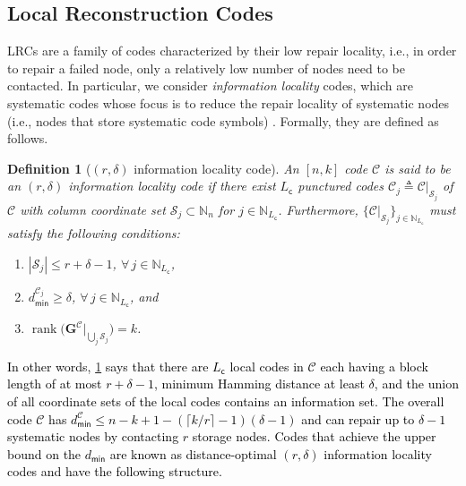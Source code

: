 \documentclass[twocolumn,conference]{IEEEtran}
\newtheorem{definition}{Definition}
\newcommand{\eqdef}{\triangleq}              %
\newcommand{\set}[1]{\mathcal{#1}}           %
\newcommand{\Nat}[1]{\mathbb{N}_{#1}}        %
\newcommand{\code}[1]{\mathcal{#1}}          %
\newcommand{\bigrank}[1]{\operatorname{rank}\bigl(#1\bigr)}
\newcommand{\modify}[1]{\textcolor{black}{#1}}
\begin{document}
\subsection{Local Reconstruction Codes}
\label{sec:local-reconstr-codes}

LRCs are a family of codes characterized by their low repair locality, i.e., in order to repair a failed node, only a relatively low number of nodes need to be contacted. 
In particular, we consider \emph{information locality} codes, which are
systematic codes whose focus is to reduce the repair locality of systematic nodes (i.e., nodes that store systematic code symbols) \cite{Hua07,Hua12,Sat13,Kam14}. 
Formally, they are defined as follows.
\begin{definition}[{$(r,\delta)$ information locality code\cite[Def.~2]{Kam14}}]
\label{Def: LRC}
An $[n,k]$ code $\mathcal{C}$  is said to be an $(r,\delta)$ information locality code if there exist $L_{\mathsf c}$ punctured codes $\code{C}_j\eqdef\set{C}|_{\set{S}_j}$ of $\mathcal C$ with column coordinate set $\mathcal S_j\subset\Nat{n}$ for $j\in\Nat{L_{\mathsf{c}}}$. Furthermore, $\{\code{C}|_{\set{S}_j}\}_{j\in\Nat{L_{\mathsf{c}}}}$ must satisfy the following conditions:
\begin{enumerate}
\item $|\mathcal S_j|\leq r+\delta-1$, $\forall\,j\in\Nat{L_{\mathsf{c}}}$,
\item $d_{\mathsf{min}}^{\mathcal C_j}\geq\delta$, $\forall\,j\in\Nat{L_{\mathsf{c}}}$, and
\item $\bigrank{\bm G^{\mathcal C}|_{\bigcup_j\set{S}_j}}=k$.
\end{enumerate}
\end{definition}

\modify{In other words, \cref{Def: LRC} says that there are $L_\mathsf{c}$ local codes in $\mathcal C$ each having a block length of at most $r+\delta-1$, minimum Hamming distance at least $\delta$, and the \modify{union of all coordinate sets of the local codes contains} an information set. The overall code $\mathcal C$ has $d_{\mathsf{min}}^{\mathcal C}\leq n-k+1-(\lceil k/r\rceil-1)(\delta-1)$ and can repair up to $\delta-1$ systematic nodes by contacting $r$ storage nodes. Codes that achieve the upper bound on the $d_{\mathsf{min}}$ are known as distance-optimal $(r,\delta)$ information locality codes and  have the following structure.}
\end{document}
